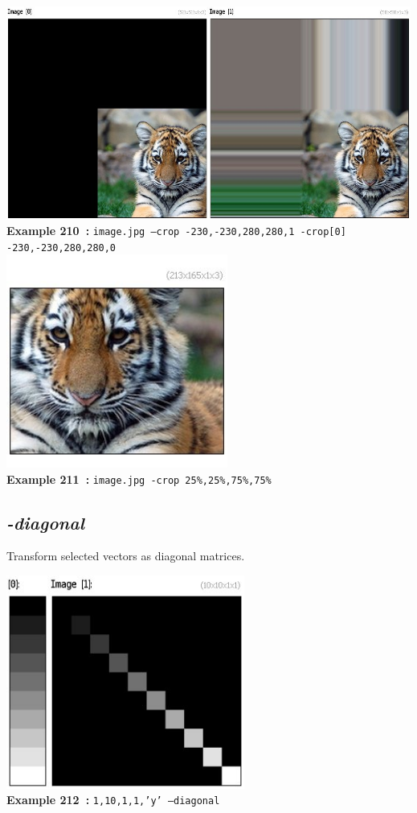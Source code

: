 \documentclass[a4paper,11pt,twoside]{book}
\begin{document}
\begin{center}\includegraphics[keepaspectratio=true,height=7cm,width=\textwidth]{img/gmic_def210.jpg}\\
{\footnotesize \textbf{Example 210~:} \texttt{image.jpg --crop -230,-230,280,280,1 -crop[0] -230,-230,280,280,0}}
\\\includegraphics[keepaspectratio=true,height=7cm,width=\textwidth]{img/gmic_def211.jpg}\\
{\footnotesize \textbf{Example 211~:} \texttt{image.jpg -crop 25\%,25\%,75\%,75\%}}
\end{center}

\subsection{\emph{-diagonal} }\vspace*{-0.5em}
Transform selected vectors as diagonal matrices.
\begin{center}\includegraphics[keepaspectratio=true,height=7cm,width=\textwidth]{img/gmic_def212.jpg}\\
{\footnotesize \textbf{Example 212~:} \texttt{1,10,1,1,'y' --diagonal}}
\end{center}
\end{document}
